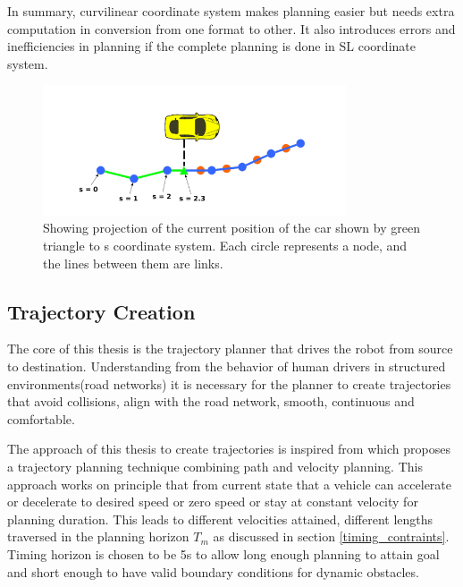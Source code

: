  In summary, curvilinear coordinate system makes planning easier but needs extra computation in conversion from one format to other. It also introduces errors and inefficiencies in planning if the complete planning is done in SL coordinate system.
 
 \begin{figure}[H]
    \centering
    \includegraphics[width=0.8\textwidth]{Images/xy_sl_conversion.png}
    \caption{Showing projection of the current position of the car shown by green triangle to s coordinate system. Each circle represents a node, and the lines between them are links.}
    \label{xy_sl_conversion}
\end{figure}


\subsection{ Trajectory Creation} \label{traj_creation}

The core of this thesis is the trajectory planner that drives the robot from source to destination. Understanding from the behavior of human drivers in structured environments(road networks) it is necessary for the planner to create trajectories that  avoid collisions, align with the road network, smooth, continuous and comfortable.

The approach of this thesis to create trajectories is inspired from \cite{unit_A_star} which proposes a trajectory planning technique combining path and velocity planning. This approach works on principle that from current state that a vehicle can accelerate or decelerate to desired speed or zero speed or stay at constant velocity for planning duration. This leads to different velocities attained, different lengths traversed in the planning horizon $ T_m $ as discussed in section \ref{timing_contraints}. Timing horizon is chosen to be 5s to allow long enough planning to attain goal and short enough to have valid boundary conditions for dynamic obstacles. 

